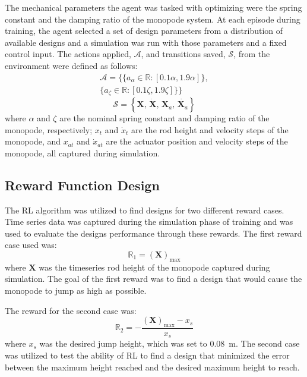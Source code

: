 \documentclass[10pt,twocolumn,letterpaper]{article}
\begin{document}
The mechanical parameters the agent was tasked with optimizing were the spring constant and the damping ratio of the monopode system. At each episode during training, the agent selected a set of design parameters from a distribution of available designs and a simulation was run with those parameters and a fixed control input. The actions applied, $\mathcal{A}$, and transitions saved, $\mathcal{S}$, from the environment were defined as follows:
%
\begin{equation}
        \label{eq:action}
        \begin{aligned}
        \mathcal{A} = \{ \{ a_{\alpha} \in \mathbb{R}: [0.1 \alpha, 1.9 \alpha] \}, \\ 
        \{ a_{\zeta} \in \mathbb{R}: [0.1 \zeta, 1.9 \zeta] \} \}
        \end{aligned}
\end{equation} 
%
\begin{equation}
        \label{eq:transitions}
        \mathcal{S}= \left \{ \textbf{X}, \, \dot{\textbf{X}}, \, \textbf{X}_a, \, \dot{\textbf{X}_a}  \right \}
\end{equation}
%
where $\alpha$ and $\zeta$ are the nominal spring constant and damping ratio of the monopode, respectively; $x_t$ and $\dot{x}_t$ are the rod height and velocity steps of the monopode, and $x_{at}$ and $\dot{x}_{at}$ are the actuator position and velocity steps of the monopode, all captured during simulation. 

\subsection{Reward Function Design}

The RL algorithm was utilized to find designs for two different reward cases. Time series data was captured during the simulation phase of training and was used to evaluate the designs performance through these rewards. The first reward case used was:
%
\begin{equation}
        \mathbb{R}_1 = \left (\textbf{X}  \right )_{\text{max}}
\end{equation}
% 
where $\textbf{X}$ was the timeseries rod height of the monopode captured during simulation. The goal of the first reward was to find a design that would cause the monopode to jump as high as possible.

The reward for the second case was:
%
\begin{equation}
        \mathbb{R}_2 = - \frac{\left (\textbf{X}  \right )_{\text{max}} - x_{s}}{x_{s}}
\end{equation}
%
where $x_s$ was the desired jump height, which was set to 0.08~m. The second case was utilized to test the ability of RL to find a design that minimized the error between the maximum height reached and the desired maximum height to reach. 
\end{document}
